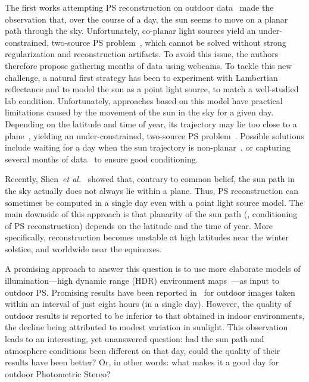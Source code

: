\documentclass{report}
\begin{document}
The first works attempting PS reconstruction on outdoor data~\cite{ackermann-cvpr-12,abrams-eccv-12} made the observation that, over the course of a day, the sun seems to move on a planar path through the sky. Unfortunately, co-planar light sources yield an under-constrained, two-source PS problem~\cite{hernandez-pami-11}, which cannot be solved without strong regularization and reconstruction artifacts. To avoid this issue, the authors therefore propose gathering months of data using webcams.
To tackle this new challenge, a natural first strategy has been to experiment with Lambertian reflectance and to model the sun as a point light source, to match a well-studied lab condition. Unfortunately, approaches based on this model have practical limitations caused by the movement of the sun in the sky for a given day. Depending on the latitude and time of year, its trajectory may lie too close to a plane~\cite{shen-pg-14}, yielding an under-constrained, two-source PS problem~\cite{hernandez-pami-11}. Possible solutions include waiting for a day when the sun trajectory is non-planar~\cite{shen-pg-14}, or capturing several months of data~\cite{ackermann-cvpr-12,abrams-eccv-12} to ensure good conditioning.

Recently, Shen~{\em et al.}~\cite{shen-pg-14} showed that, contrary to common belief, the sun path in the sky actually does not always lie within a plane. Thus, PS reconstruction can sometimes be computed in a single day even with a point light source model. The main downside of this approach is that planarity of the sun path (\ie, conditioning of PS reconstruction) depends on the latitude and the time of year. More specifically, reconstruction becomes unstable at high latitudes near the winter solstice, and worldwide near the equinoxes.

A promising approach to answer this question is to use more elaborate models of illumination---high dynamic range (HDR) environment maps~\cite{reinhard-book-05}---as input to outdoor PS. Promising results have been reported in~\cite{yu-iccp-13} for outdoor images taken within an interval of just eight hours (in a single day). However, the quality of outdoor results is reported to be inferior to that obtained in indoor environments, the decline being attributed to modest variation in sunlight. This observation leads to an interesting, yet unanswered question: had the sun path and atmosphere conditions been different on that day, could the quality of their results have been better? Or, in other words: what makes it a good day for outdoor Photometric Stereo?
\end{document}

